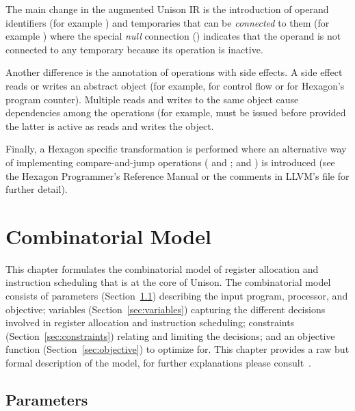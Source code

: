 \documentclass[11pt]{report}
\newenvironment{colorBox}[1]
 {\begin{tcolorbox}[
    breakable,
    colback=#1,
    colframe=white,
    boxrule=0pt
  ]}
 {\end{tcolorbox}}
\newenvironment{codeBox}
 {\begin{colorBox}{bgcolor4!20}}
 {\end{colorBox}}
\begin{document}
\begin{codeBox}
\end{codeBox}

The main change in the augmented Unison IR is the introduction of operand
identifiers (for example ) and temporaries that can be
\emph{connected} to them (for example ) where the
special \emph{null} connection (\code{-}) indicates that the operand is not
connected to any temporary because its operation is inactive.

Another difference is the annotation of operations with side effects.
%
A side effect reads or writes an abstract object (for example, 
for control flow or  for Hexagon's program counter).
%
Multiple reads and writes to the same object cause dependencies among the
operations (for example,  must be issued before  provided the
latter is active as  reads and  writes the 
object.

Finally, a Hexagon specific transformation is performed where an alternative way
of implementing compare-and-jump operations ( and ; 
and ) is introduced (see the Hexagon Programmer's Reference Manual or
the comments in LLVM's  file for further detail).

\chapter{Combinatorial Model}\label{sec:combinatorial-model}

This chapter formulates the combinatorial model of register allocation and
instruction scheduling that is at the core of Unison.
%
The combinatorial model consists of parameters (Section~\ref{sec:parameters})
describing the input program, processor, and objective; variables
(Section~\ref{sec:variables}) capturing the different decisions involved in
register allocation and instruction scheduling; constraints
(Section~\ref{sec:constraints}) relating and limiting the decisions; and an
objective function (Section~\ref{sec:objective}) to optimize for.
%
This chapter provides a raw but formal description of the model, for further
explanations please consult~\cite{Castaneda2014c}.

\section{Parameters}\label{sec:parameters}
\end{document}
